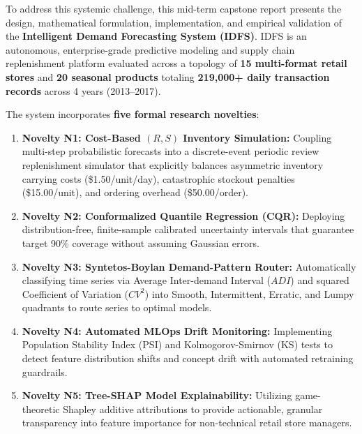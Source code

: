 \documentclass[12pt,a4paper,oneside]{report}
\theoremstyle{definition}
\begin{document}
\noindent To address this systemic challenge, this mid-term capstone report presents the design, mathematical formulation, implementation, and empirical validation of the \textbf{Intelligent Demand Forecasting System (IDFS)}. IDFS is an autonomous, enterprise-grade predictive modeling and supply chain replenishment platform evaluated across a topology of \textbf{15 multi-format retail stores} and \textbf{20 seasonal products} totaling \textbf{219,000+ daily transaction records} across 4 years (2013--2017).

\noindent The system incorporates \textbf{five formal research novelties}:
\begin{enumerate}[itemsep=0.15cm]
    \item \textbf{Novelty N1: Cost-Based $(R, S)$ Inventory Simulation:} Coupling multi-step probabilistic forecasts into a discrete-event periodic review replenishment simulator that explicitly balances asymmetric inventory carrying costs (\$1.50/unit/day), catastrophic stockout penalties (\$15.00/unit), and ordering overhead (\$50.00/order).
    \item \textbf{Novelty N2: Conformalized Quantile Regression (CQR):} Deploying distribution-free, finite-sample calibrated uncertainty intervals that guarantee target 90\% coverage without assuming Gaussian errors.
    \item \textbf{Novelty N3: Syntetos-Boylan Demand-Pattern Router:} Automatically classifying time series via Average Inter-demand Interval ($ADI$) and squared Coefficient of Variation ($CV^2$) into Smooth, Intermittent, Erratic, and Lumpy quadrants to route series to optimal models.
    \item \textbf{Novelty N4: Automated MLOps Drift Monitoring:} Implementing Population Stability Index (PSI) and Kolmogorov-Smirnov (KS) tests to detect feature distribution shifts and concept drift with automated retraining guardrails.
    \item \textbf{Novelty N5: Tree-SHAP Model Explainability:} Utilizing game-theoretic Shapley additive attributions to provide actionable, granular transparency into feature importance for non-technical retail store managers.
\end{enumerate}
\end{document}
